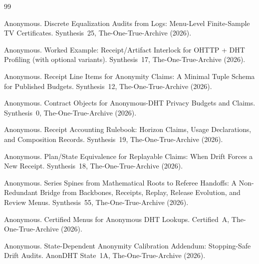 \documentclass[11pt]{article}
\begin{document}
\begin{thebibliography}{99}\small

Anonymous.
\newblock Discrete Equalization Audits from Logs: Menu-Level Finite-Sample TV Certificates.
\newblock Synthesis~25, The-One-True-Archive (2026).

Anonymous.
\newblock Worked Example: Receipt/Artifact Interlock for OHTTP + DHT Profiling (with optional variants).
\newblock Synthesis~17, The-One-True-Archive (2026).

Anonymous.
\newblock Receipt Line Items for Anonymity Claims: A Minimal Tuple Schema for Published Budgets.
\newblock Synthesis~12, The-One-True-Archive (2026).

Anonymous.
\newblock Contract Objects for Anonymous-DHT Privacy Budgets and Claims.
\newblock Synthesis~0, The-One-True-Archive (2026).

Anonymous.
\newblock Receipt Accounting Rulebook: Horizon Claims, Usage Declarations, and Composition Records.
\newblock Synthesis~19, The-One-True-Archive (2026).

Anonymous.
\newblock Plan/State Equivalence for Replayable Claims: When Drift Forces a New Receipt.
\newblock Synthesis~18, The-One-True-Archive (2026).

Anonymous.
\newblock Series Spines from Mathematical Roots to Referee Handoffs: A Non-Redundant Bridge from Backbones, Receipts, Replay, Release Evolution, and Review Menus.
\newblock Synthesis~55, The-One-True-Archive (2026).

Anonymous.
\newblock Certified Menus for Anonymous DHT Lookups.
\newblock Certified~A, The-One-True-Archive (2026).

Anonymous.
\newblock State-Dependent Anonymity Calibration Addendum: Stopping-Safe Drift Audits.
\newblock AnonDHT State~1A, The-One-True-Archive (2026).

\end{thebibliography}
\end{document}

